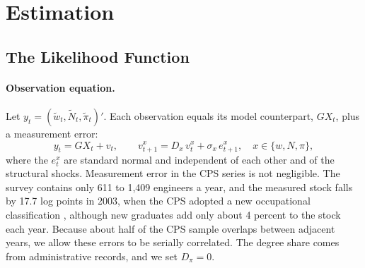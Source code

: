 \documentclass[12pt]{article}
\begin{document}
\section{Estimation}\label{sec:estimation}

\subsection{The Likelihood Function}\label{sec:likelihood}

\paragraph{Observation equation.} Let $y_t = (\tilde w_t, \tilde N_t, \tilde \pi_t)'$. Each observation equals its model counterpart, $G X_t$, plus a measurement error:
\begin{equation}\label{eq:obs}
  y_t = G X_t + v_t, \qquad
  v^{x}_{t+1} = D_x\, v^{x}_t + \sigma_x\, e^{x}_{t+1}, \quad x \in \{w, N, \pi\},
\end{equation}
where the $e^{x}_t$ are standard normal and independent of each other and of the structural shocks. Measurement error in the CPS series is not negligible. The survey contains only 611 to 1,409 engineers a year, and the measured stock falls by 17.7 log points in 2003, when the CPS adopted a new occupational classification \citep{bls_cpsoccind}, although new graduates add only about 4 percent to the stock each year. Because about half of the CPS sample overlaps between adjacent years, we allow these errors to be serially correlated. The degree share comes from administrative records, and we set $D_\pi = 0$.
\end{document}
